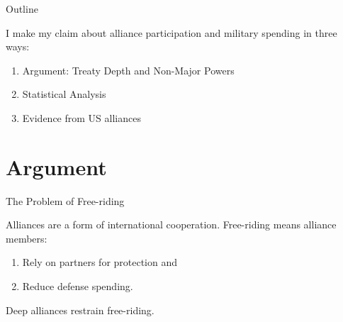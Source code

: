\documentclass[12pt]{beamer}
\begin{document}

\begin{frame}{Outline}

I make my claim about alliance participation and military spending in three ways: 

\pause
\begin{enumerate}
\item Argument: Treaty Depth and Non-Major Powers
\pause
\item Statistical Analysis
\pause
\item Evidence from US alliances
\end{enumerate}


\end{frame}


\section{Argument}



\begin{frame}{The Problem of Free-riding}

Alliances are a form of international cooperation. Free-riding means alliance members:

\begin{enumerate} 
\pause
\item Rely on partners for protection and  
\pause
\item Reduce defense spending.
\end{enumerate}  

\end{frame}


\begin{frame}[standout]

Deep alliances restrain free-riding.   

\end{frame}

\end{document}
